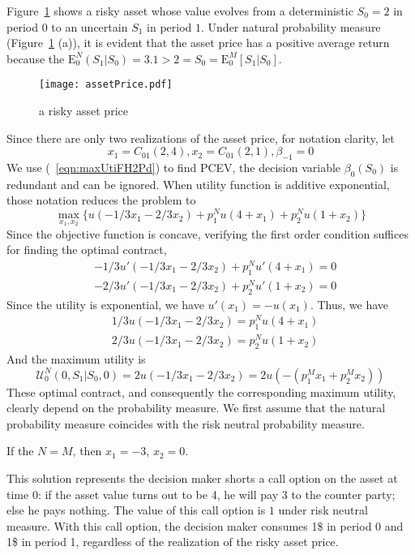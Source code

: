\documentclass{article}[12pt letter]
\newcommand{\E}{\mathrm{E}}
\begin{document}
Figure~\ref{assetPrice} shows a risky asset whose value evolves from a deterministic $S_0=2$ in period $0$ to an uncertain $S_1$ in period $1$. Under natural probability measure (Figure~\ref{assetPrice} (a)), it is evident that the asset price has a positive average return because the $\E_0^N (S_1|S_0) = 3.1 > 2 = S_0=\E_0^M[S_1|S_0]$.  

\begin{figure}
\texttt{[image: assetPrice.pdf]}\newline
\caption{a risky asset price}%
\label{assetPrice}%
\end{figure}
\bigskip

Since there are only two realizations of the asset price, for notation clarity, let
\[ x_1 = C_{01}(2,4), x_2 = C_{01}(2,1), \beta_{-1} = 0 \]
We use (~\ref{eqn:maxUtiFH2Pd}) to find PCEV, the decision variable $\beta_0(S_0)$ is redundant and can be ignored. When utility function is additive exponential, those notation reduces the problem to
\[ \max_{x_1,x_2} \{ u(-1/3 x_1 - 2/3 x_2) + p_1^Nu(4+x_1) + p_2^Nu(1+x_2)\}\]
Since the objective function is concave, verifying the first order condition suffices for finding the optimal contract,
\begin{align}
&-1/3u'(-1/3x_1-2/3 x_2) + p_1^Nu'(4+x_1) = 0\\
&-2/3u'(-1/3x_1-2/3 x_2) + p_2^Nu'(1+x_2) = 0
\end{align}
Since the utility is exponential, we have $u'(x_1) =-u(x_1)$. Thus, we have
\begin{align}
&1/3u(-1/3x_1-2/3 x_2) = p_1^Nu(4+x_1)\\
&2/3u(-1/3x_1-2/3 x_2) = p_2^Nu(1+x_2) 
\end{align}
And the maximum utility is 
\[\mathcal{U}^N_0(0, S_1|S_0,0) = 2u(-1/3x_1-2/3x_2) = 2u(-(p_1^M x_1+p_2^M x_2)) \]
These optimal contract, and consequently the corresponding maximum utility, clearly depend on the probability measure.  We first assume that the natural probability measure coincides with the risk neutral probability measure. 

{\example If the $N=M$, then $x_1 = -3$, $x_2 = 0$. }

This solution represents the decision maker shorts a call option on the asset at time 0: if the asset value turns out to be 4, he will pay 3 to the counter party; else he pays nothing. The value of this call option is $1$ under risk neutral measure. With this call option, the decision maker consumes 1\$ in period 0 and 1\$ in period 1, regardless of the realization of the risky asset price. 
\end{document}
